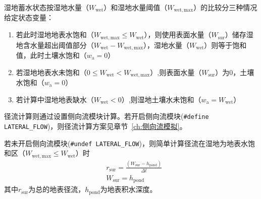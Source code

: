 湿地蓄水状态按湿地水量（$W_{\mathrm{wet}}$）和湿地水量阈值（$W_{\mathrm{wet,max}}$）的比较分三种情况给定状态变量：

\begin{enumerate}
  \item 若此时湿地地表水饱和（$W_{\mathrm{wet,max}} \leq W_{\mathrm{wet}}$），则使用表面水量（$W_{\mathrm{sur}}$）储存湿地含水量超出阈值部分（$W_{\mathrm{wet}}-W_{\mathrm{wet,max}}$），湿地水量（$W_{\mathrm{wet}}$）则等于饱和值，此时土壤水饱和（$w_{\mathrm{a}}=0$）

  \item 若湿地地表水未饱和（$0 \leq W_{\mathrm{wet}} < W_{\mathrm{wet,max}}$）,则表面水量（$W_{\mathrm{sur}}$）为0，土壤水饱和（$w_{\mathrm{a}}=0$）

  \item 若计算中湿地地表缺水（$W_{\mathrm{wet}} < 0$）,则湿地土壤水未饱和（$w_{\mathrm{a}}=W_{\mathrm{wet}}$）
\end{enumerate}

径流计算则通过设置侧向流模块计算。若开启侧向流模块(\texttt{\#define LATERAL\_FLOW})，则径流计算方案见章节~\ref{ch:侧向流模拟}。

若未开启侧向流模块(\texttt{\#undef LATERAL\_FLOW})，则简单计算径流在湿地为地表水饱和区（$W_{\mathrm{wet,max}} \leq W_{\mathrm{wet}}$）时
\begin{equation}
  \begin{aligned}
    &r_{\mathrm{sur}}=\frac{\left(W_{\mathrm{sur}}-h_{\mathrm{pond}}\right)}{\Delta t} \\
    &W_{\mathrm{sur}}=h_{\mathrm{pond}}
  \end{aligned}
\end{equation}
其中$r_{\mathrm{sur}}$为总的地表径流，$h_{\mathrm{pond}}$为地表积水深度。
